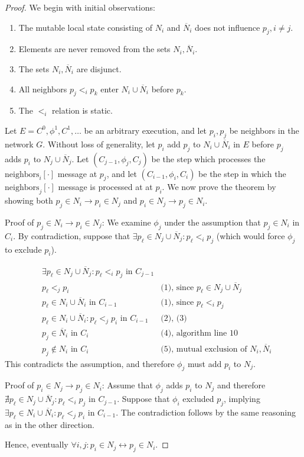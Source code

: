 \begin{proof}
We begin with initial observations:

\begin{enumerate}
\item The mutable local state consisting of $N_i$ and
$\overline{N}_i$ does not influence $p_j, i \neq j$.
\item Elements are never removed from the sets $N_i, \overline{N}_i$.
\item The sets $N_i, \overline{N}_i$ are disjunct.
\item All neighbors $p_j <_i p_k$ enter $N_i \cup \overline{N}_i$ before $p_k$.
\item The $<_i$ relation is static.
\end{enumerate}

Let $E = C^0, \phi^1, C^1, \ldots$ be an arbitrary execution, and let $p_i, p_j$ be neighbors
in the network $G$. Without loss of generality, let $p_i$ add $p_j$ to $N_i \cup \overline{N}_i$
in $E$ before $p_j$ adds $p_i$ to $N_j \cup \overline{N}_j$. 
Let $(C_{j-1}, \phi_j, C_j)$ be the step which processes
the $\text{neighbors}_i[\cdot]$ message at $p_j$, and let $(C_{i-1}, \phi_i, C_i)$
be the step in which the $\text{neighbors}_j[\cdot]$ message is processed at at $p_i$.
We now prove the theorem by
showing both $p_j \in N_i \rightarrow p_i \in N_j$ and $p_i \in N_j \rightarrow p_j \in N_i$.

Proof of $p_j \in N_i \rightarrow p_i \in N_j$: 
We examine $\phi_j$ under the assumption that $p_j \in N_i$ in $C_i$.
By contradiction, suppose that $\exists p_\ell \in N_j \cup \overline{N}_j: 
p_\ell <_i p_j$ (which would force $\phi_j$ to exclude $p_i$). 

\begin{align}
&\exists p_\ell \in N_j \cup \overline{N}_j: p_\ell <_i p_j \text{ in } C_{j-1} & \\
&p_\ell <_j p_i & \text{(1), since } p_\ell \in N_j \cup \overline{N}_j \\
&p_\ell \in N_i \cup \overline{N}_i \text{ in } C_{i-1} & \text{(1), since } p_\ell <_i p_j \\
&p_\ell \in N_i \cup \overline{N}_i: p_\ell <_j p_i \text{ in } C_{i-1} & \text{(2), (3)} \\
&p_j \in \overline{N}_i \text{ in } C_i & \text{(4), algorithm line 10} \\
&p_j \not\in N_i \text{ in } C_i & \text{(5), mutual exclusion of } N_i, \overline{N}_i
\end{align}
This contradicts the assumption, and therefore $\phi_j$ must add $p_i$ to $N_j$.

Proof of $p_i \in N_j \rightarrow p_j \in N_i$: Assume that $\phi_j$ adds
$p_i$ to $N_j$ and therefore $\nexists p_\ell \in N_j \cup \overline{N}_j: 
p_\ell <_i p_j$ in $C_{j-1}$. Suppose that $\phi_i$ excluded $p_j$, implying
$\exists p_\ell \in N_i \cup \overline{N}_i: p_\ell <_j p_i \text{ in } C_{i-1}$.
The contradiction follows by the same reasoning as in the other direction.

Hence, eventually $\forall i,j: p_i \in N_j \leftrightarrow p_j \in N_i$.
\end{proof}

